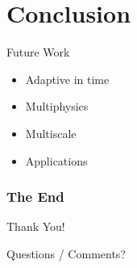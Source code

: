 \documentclass[]{beamer}
\begin{document}
\section{Conclusion}

\begin{frame}{Future Work}

  \begin{itemize}
  \item Adaptive in time
  \item Multiphysics
  \item Multiscale
  \item Applications
  \end{itemize}

\end{frame}


\begin{frame}
  \frametitle{The End}
  \begin{center}
    Thank You!

    Questions / Comments?
  \end{center}
\end{frame}
\end{document}

